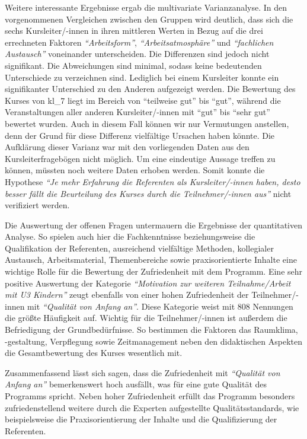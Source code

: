 \documentclass[12pt,a4paper]{article}
\begin{document}
Weitere interessante Ergebnisse ergab die multivariate Varianzanalyse. In den vorgenommenen Vergleichen zwischen den Gruppen wird deutlich, dass sich die sechs Kursleiter/-innen in ihren mittleren Werten in Bezug auf die drei errechneten Faktoren \textit{"`Arbeitsform"'}, \textit{"`Arbeitsatmosphäre"'} und \textit{"`fachlichen Austausch"'} voneinander unterscheiden. Die Differenzen sind jedoch nicht signifikant. Die Abweichungen sind minimal, sodass keine bedeutenden Unterschiede zu verzeichnen sind. Lediglich bei einem Kursleiter konnte ein signifikanter Unterschied zu den Anderen aufgezeigt werden. Die Bewertung des Kurses von kl\_7 liegt im Bereich von "`teilweise gut"' bis "`gut"', während die Veranstaltungen aller anderen Kursleiter/-innen  mit "`gut"' bis "`sehr gut"' bewertet wurden. Auch in diesem Fall können wir nur Vermutungen anstellen, denn der Grund für diese Differenz vielfältige Ursachen haben könnte. Die Aufklärung dieser Varianz war mit den vorliegenden Daten aus den Kursleiterfragebögen nicht möglich. Um eine eindeutige Aussage treffen zu können, müssten noch weitere Daten erhoben werden. Somit konnte die Hypothese \textit{"`Je mehr Erfahrung die Referenten als Kursleiter/-innen haben, desto besser fällt die Beurteilung des Kurses durch die Teilnehmer/-innen aus"'} nicht verifiziert werden.

Die Auswertung der offenen Fragen untermauern die Ergebnisse der quantitativen Analyse. So spielen auch hier die Fachkenntnisse beziehungsweise die Qualifikation der Referenten, ausreichend vielfältige Methoden, kollegialer Austausch, Arbeitsmaterial, Themenbereiche sowie praxisorientierte Inhalte eine wichtige Rolle für die Bewertung der Zufriedenheit mit dem Programm. Eine sehr positive Auswertung der Kategorie\textit{ "`Motivation zur weiteren Teilnahme/Arbeit mit U3 Kindern"'} zeugt ebenfalls von einer hohen Zufriedenheit der Teilnehmer/-innen mit\textit{ "`Qualität von Anfang an"'}. Diese Kategorie weist mit 808 Nennungen die größte Häufigkeit auf. Wichtig für die Teilnehmer/-innen ist außerdem die Befriedigung der Grundbedürfnisse. So bestimmen die Faktoren das Raumklima, -gestaltung, Verpflegung sowie Zeitmanagement neben den didaktischen Aspekten die Gesamtbewertung des Kurses wesentlich mit. 

Zusammenfassend lässt sich sagen, dass die Zufriedenheit mit\textit{ "`Qualität von Anfang an"'}  bemerkenswert hoch ausfällt, was für eine gute Qualität des Programms spricht. Neben hoher Zufriedenheit erfüllt das Programm besonders zufriedenstellend weitere durch die Experten aufgestellte Qualitätsstandards, wie beispielsweise die Praxisorientierung der Inhalte und die Qualifizierung der Referenten. 
\end{document}
